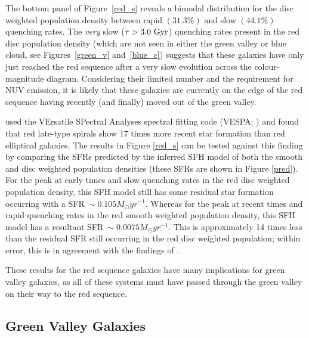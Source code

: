 The bottom panel of Figure~\ref{red_s} reveals a bimodal distribution for the disc weighted population density between rapid $(31.3\%)$ and slow $(44.1\%)$ quenching rates. The \emph{very} slow ($\tau > 3.0 ~\rm{Gyr}$) quenching rates present in the red disc population density (which are not seen in either the green valley or blue cloud, see Figures~\ref{green_v} and~\ref{blue_c}) suggests that these galaxies have only just reached the red sequence after a very slow evolution across the colour-magnitude diagram. Considering their limited number and the requirement for NUV emission, it is likely that these galaxies are currently on the edge of the red sequence having recently (and finally) moved out of the green valley. 

\citet{tojeiro13} used the VErsatile SPectral Analyses spectral fitting code (VESPA; \citealt{tojeiro07}) and found that red late-type spirals show 17 times more recent star formation than red elliptical galaxies. The results in Figure \ref{red_s} can be tested against this finding  by comparing the SFRs predicted by the inferred SFH model of both the smooth and disc weighted population densities (these SFRs are shown in Figure \ref{pred}). For the peak at early times and slow quenching rates in the red disc weighted population density, this SFH model still has some residual star formation occurring with a SFR$~\sim0.105 M_{\odot}yr^{-1}$. Whereas for the peak at recent times and rapid quenching rates in the red smooth weighted population density, this SFH model has a resultant SFR$~\sim0.0075 M_{\odot}yr^{-1}$. This is approximately 14 times less than the residual SFR still occurring in the red disc weighted population; within error, this is in agreement with the findings of \citet{tojeiro13}. 

These results for the red sequence galaxies have many implications for green valley galaxies, as all of these systems must have passed through the green valley on their way to the red sequence.


\subsection{Green Valley Galaxies}\label{gv}

